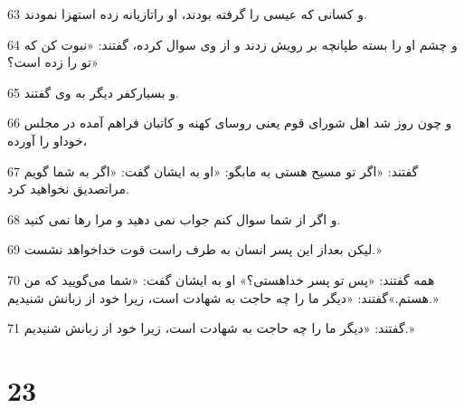 \par 63 و کسانی که عیسی را گرفته بودند، او راتازیانه زده استهزا نمودند.
\par 64 و چشم او را بسته طپانچه بر رویش زدند و از وی سوال کرده، گفتند: «نبوت کن که تو را زده است؟»
\par 65 و بسیارکفر دیگر به وی گفتند.
\par 66 و چون روز شد اهل شورای قوم یعنی روسای کهنه و کاتبان فراهم آمده در مجلس خوداو را آورده،
\par 67 گفتند: «اگر تو مسیح هستی به مابگو: «او به ایشان گفت: «اگر به شما گویم مراتصدیق نخواهید کرد.
\par 68 و اگر از شما سوال کنم جواب نمی دهید و مرا رها نمی کنید.
\par 69 لیکن بعداز این پسر انسان به طرف راست قوت خداخواهد نشست.»
\par 70 همه گفتند: «پس تو پسر خداهستی؟» او به ایشان گفت: «شما می‌گویید که من هستم.»گفتند: «دیگر ما را چه حاجت به شهادت است، زیرا خود از زبانش شنیدیم.»
\par 71 گفتند: «دیگر ما را چه حاجت به شهادت است، زیرا خود از زبانش شنیدیم.»

\chapter{23}

